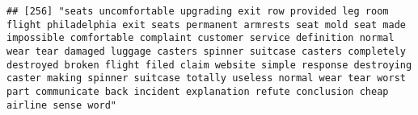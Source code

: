 \documentclass[
]{article}
\begin{document}
\begin{verbatim}
## [256] "seats uncomfortable upgrading exit row provided leg room flight philadelphia exit seats permanent armrests seat mold seat made impossible comfortable complaint customer service definition normal wear tear damaged luggage casters spinner suitcase casters completely destroyed broken flight filed claim website simple response destroying caster making spinner suitcase totally useless normal wear tear worst part communicate back incident explanation refute conclusion cheap airline sense word"                                                                                                                                                                                                                                                                                                                                                                                                                                                                                                                                                                                                                                                                                                                                                                                                                                                                                                                                                                                                                                                                                                                                                                                                                                                                                   

\end{verbatim}
\end{document}

